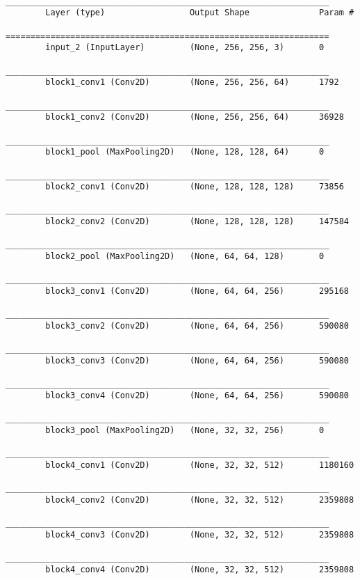 \begin{table}[H]
    \centering
    \begin{lstlisting}
        _________________________________________________________________
        Layer (type)                 Output Shape              Param #   
        =================================================================
        input_2 (InputLayer)         (None, 256, 256, 3)       0         
        _________________________________________________________________
        block1_conv1 (Conv2D)        (None, 256, 256, 64)      1792      
        _________________________________________________________________
        block1_conv2 (Conv2D)        (None, 256, 256, 64)      36928     
        _________________________________________________________________
        block1_pool (MaxPooling2D)   (None, 128, 128, 64)      0         
        _________________________________________________________________
        block2_conv1 (Conv2D)        (None, 128, 128, 128)     73856     
        _________________________________________________________________
        block2_conv2 (Conv2D)        (None, 128, 128, 128)     147584    
        _________________________________________________________________
        block2_pool (MaxPooling2D)   (None, 64, 64, 128)       0         
        _________________________________________________________________
        block3_conv1 (Conv2D)        (None, 64, 64, 256)       295168    
        _________________________________________________________________
        block3_conv2 (Conv2D)        (None, 64, 64, 256)       590080    
        _________________________________________________________________
        block3_conv3 (Conv2D)        (None, 64, 64, 256)       590080    
        _________________________________________________________________
        block3_conv4 (Conv2D)        (None, 64, 64, 256)       590080    
        _________________________________________________________________
        block3_pool (MaxPooling2D)   (None, 32, 32, 256)       0         
        _________________________________________________________________
        block4_conv1 (Conv2D)        (None, 32, 32, 512)       1180160   
        _________________________________________________________________
        block4_conv2 (Conv2D)        (None, 32, 32, 512)       2359808   
        _________________________________________________________________
        block4_conv3 (Conv2D)        (None, 32, 32, 512)       2359808   
        _________________________________________________________________
        block4_conv4 (Conv2D)        (None, 32, 32, 512)       2359808   

\end{lstlisting}
\end{table}
